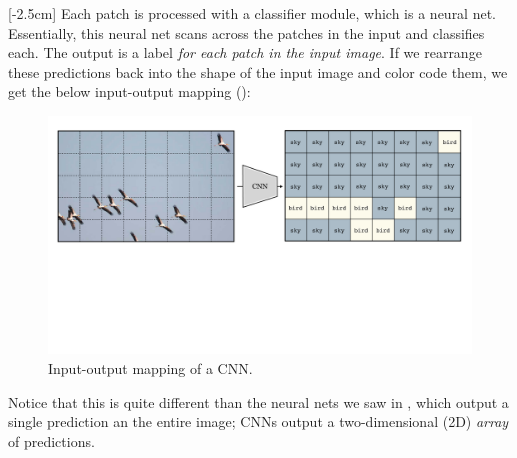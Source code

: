 [-2.5cm]
Each patch is processed with a classifier module, which is a neural net. Essentially, this neural net scans across the patches in the input and classifies each. The output is a label \textit{for each patch in the input image}. If we rearrange these predictions back into the shape of the input image and color code them, we get the below input-output mapping (\fig{\ref{fig:convolutional_neural_nets:CNN_example_coarse}}):
\vspace{-0.2cm}
\begin{figure}[h!]
\centerline{
    \includegraphics[width=0.95\linewidth]{./figures/convolutional_neural_nets/CNN_example_coarse.pdf}}
    \caption{Input-output mapping of a CNN.}
    \label{fig:convolutional_neural_nets:CNN_example_coarse}
\end{figure}

Notice that this is quite different than the neural nets we saw in \chap{\ref{chapter:neural_nets}}, which output a single prediction an the entire image; CNNs output a two-dimensional (2D) \textit{array} of predictions.

